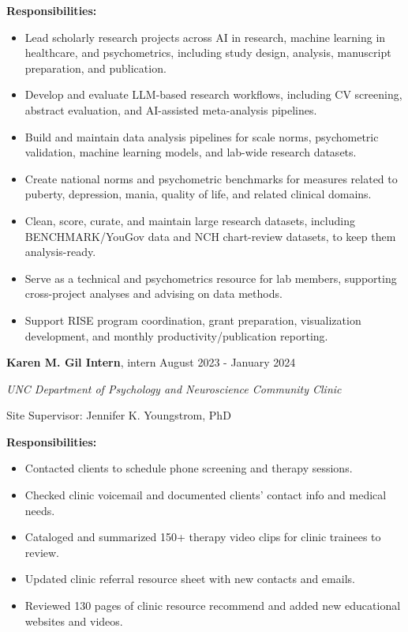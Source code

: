 \documentclass[12pt]{article}
\begin{document}
\vspace{0.5em} \hspace{1em}
\textbf{Responsibilities:}
\begin{itemize} [left=3em]
    \itemsep=-0.35em
    \item Lead scholarly research projects across AI in research, machine learning in healthcare, and psychometrics, including study design, analysis, manuscript preparation, and publication.
    \item Develop and evaluate LLM-based research workflows, including CV screening, abstract evaluation, and AI-assisted meta-analysis pipelines.
    \item Build and maintain data analysis pipelines for scale norms, psychometric validation, machine learning models, and lab-wide research datasets.
    \item Create national norms and psychometric benchmarks for measures related to puberty, depression, mania, quality of life, and related clinical domains.
    \item Clean, score, curate, and maintain large research datasets, including BENCHMARK/YouGov data and NCH chart-review datasets, to keep them analysis-ready.
    \item Serve as a technical and psychometrics resource for lab members, supporting cross-project analyses and advising on data methods.
    \item Support RISE program coordination, grant preparation, visualization development, and monthly productivity/publication reporting.
\end{itemize}

\vspace{1em}
\noindent \textbf{Karen M. Gil Intern}, intern
\hfill August 2023 - January 2024

\noindent \textit{UNC Department of Psychology and Neuroscience Community Clinic}

\noindent Site Supervisor: Jennifer K. Youngstrom, PhD

\vspace{0.5em} \hspace{1em}
\textbf{Responsibilities:}
\begin{itemize} [left=3em]
    \itemsep=-0.35em
    \item Contacted clients to schedule phone screening and therapy sessions.
    \item Checked clinic voicemail and documented clients' contact info and medical needs.
    \item Cataloged and summarized 150+ therapy video clips for clinic trainees to review. 
    \item Updated clinic referral resource sheet with new contacts and emails.
    \item Reviewed 130 pages of clinic resource recommend and added new educational websites and videos. 
\end{itemize}
\end{document}
